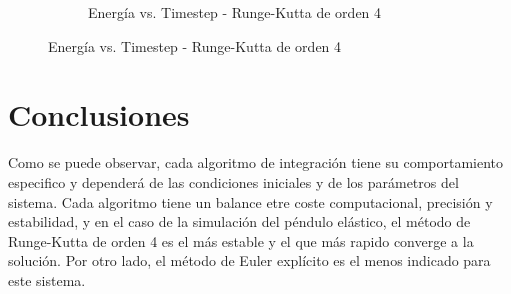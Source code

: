 \documentclass{article}
\begin{document}
\begin{figure}[H]
    \centering
    \begin{subfigure}{0.48\textwidth}
        \centering
        \caption{Energía vs. Timestep - Runge-Kutta de orden 4}
        \label{fig:energy_vs_timestep_RKIV}
    \end{subfigure}
\label{fig:combined_energy_vs_timestep_3}
\end{figure}

\section{Conclusiones}

Como se puede observar, cada algoritmo de integración tiene su comportamiento especifico y dependerá de las condiciones iniciales y de los parámetros del sistema. Cada algoritmo tiene un balance etre coste computacional, precisión y estabilidad, y en el caso de la simulación del péndulo elástico, el método de Runge-Kutta de orden 4 es el más estable y el que más rapido converge a la solución. Por otro lado, el método de Euler explícito es el menos indicado para este sistema.
\end{document}
